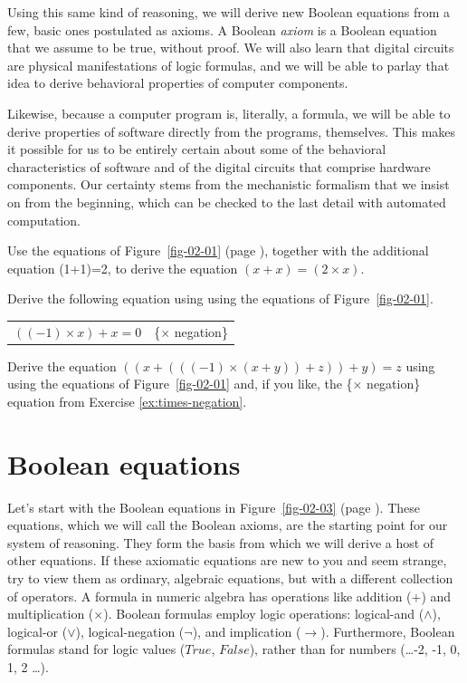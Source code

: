 Using this same kind of reasoning, we will derive new Boolean equations
from a few, basic ones postulated as axioms.
A Boolean \emph{axiom} is a Boolean equation
that we assume to be true, without proof.
We will also learn that digital circuits are physical
manifestations of logic formulas, and we will be able to
parlay that idea to derive behavioral properties of
computer components.

Likewise, because a computer program is,
literally, a formula, we will be able to derive
properties of software directly from the programs, themselves.
This makes it possible for us to be entirely
certain about some of the behavioral characteristics of
software and of the digital circuits that
comprise hardware components.
Our certainty stems from the mechanistic
formalism that we insist on from the beginning,
which can be checked to the last detail with automated computation.

\begin{ExerciseList}
\label{ex:ch02-intro}
\Exercise
Use the equations of Figure~\ref{fig-02-01} (page \pageref{fig-02-01}),
together with the additional equation (1+1)=2, to derive the equation $(x + x) = (2 \times x)$.

\Exercise\label{ex:times-negation}
Derive the following equation
using using the equations of Figure~\ref{fig-02-01}.
\begin{center}
\begin{tabular}{ll}
$((-1) \times x) + x = 0$    & \{$\times$ negation\}
\end{tabular}
\end{center}

\Exercise
Derive the equation $((x + (((-1) \times (x + y)) + z)) + y) = z$
using using the equations of Figure~\ref{fig-02-01} and,
if you like,
the \{$\times$ negation\} equation from Exercise \ref{ex:times-negation}.
\end{ExerciseList}

\section{Boolean equations}
\label{sec:boolean-equations}
Let's start with the Boolean equations in
Figure~\ref{fig-02-03} (page \pageref{fig-02-03}).
These equations, which we will call the
Boolean axioms,
are the starting point for our system of reasoning.
They form the basis from which we will derive
a host of other equations.
If these axiomatic equations
are new to you and seem strange,
try to view them as ordinary,
algebraic equations, but with a different collection of operators.
A formula in numeric algebra has operations like addition
($+$) and multiplication ($\times$). Boolean formulas employ logic
operations: logical-and ($\wedge$), logical-or ($\vee$),
logical-negation ($\neg$), and implication ($\rightarrow$).
Furthermore, Boolean formulas stand for logic values
($True$, $False$), rather than for numbers (\dots -2, -1, 0, 1, 2 \dots).

